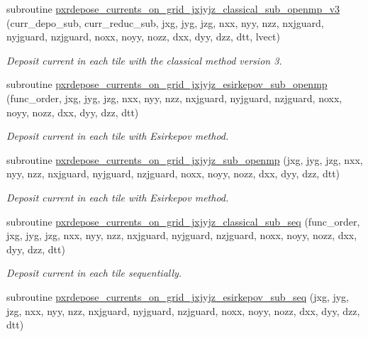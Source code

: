 \begin{DoxyCompactItemize}
subroutine \hyperlink{current__deposition_8_f90_a05b540593f69d201b9ac6e74b0fea593}{pxrdepose\+\_\+currents\+\_\+on\+\_\+grid\+\_\+jxjyjz\+\_\+classical\+\_\+sub\+\_\+openmp\+\_\+v3} (curr\+\_\+depo\+\_\+sub, curr\+\_\+reduc\+\_\+sub, jxg, jyg, jzg, nxx, nyy, nzz, nxjguard, nyjguard, nzjguard, noxx, noyy, nozz, dxx, dyy, dzz, dtt, lvect)
\begin{DoxyCompactList}\small\item\em Deposit current in each tile with the classical method version 3. \end{DoxyCompactList}\item 
subroutine \hyperlink{current__deposition_8_f90_ae617423f1f21cbacb686a291c6b0ad7b}{pxrdepose\+\_\+currents\+\_\+on\+\_\+grid\+\_\+jxjyjz\+\_\+esirkepov\+\_\+sub\+\_\+openmp} (func\+\_\+order, jxg, jyg, jzg, nxx, nyy, nzz, nxjguard, nyjguard, nzjguard, noxx, noyy, nozz, dxx, dyy, dzz, dtt)
\begin{DoxyCompactList}\small\item\em Deposit current in each tile with Esirkepov method. \end{DoxyCompactList}\item 
subroutine \hyperlink{current__deposition_8_f90_a7c88c5f1acf180c78f31dfdeb4b80516}{pxrdepose\+\_\+currents\+\_\+on\+\_\+grid\+\_\+jxjyjz\+\_\+sub\+\_\+openmp} (jxg, jyg, jzg, nxx, nyy, nzz, nxjguard, nyjguard, nzjguard, noxx, noyy, nozz, dxx, dyy, dzz, dtt)
\begin{DoxyCompactList}\small\item\em Deposit current in each tile with Esirkepov method. \end{DoxyCompactList}\item 
subroutine \hyperlink{current__deposition_8_f90_a9cba9f74ee775de5a5f60eb97ff619a4}{pxrdepose\+\_\+currents\+\_\+on\+\_\+grid\+\_\+jxjyjz\+\_\+classical\+\_\+sub\+\_\+seq} (func\+\_\+order, jxg, jyg, jzg, nxx, nyy, nzz, nxjguard, nyjguard, nzjguard, noxx, noyy, nozz, dxx, dyy, dzz, dtt)
\begin{DoxyCompactList}\small\item\em Deposit current in each tile sequentially. \end{DoxyCompactList}\item 
subroutine \hyperlink{current__deposition_8_f90_ac4575c491c1cfe9d048c6cb1b6d5fbdb}{pxrdepose\+\_\+currents\+\_\+on\+\_\+grid\+\_\+jxjyjz\+\_\+esirkepov\+\_\+sub\+\_\+seq} (jxg, jyg, jzg, nxx, nyy, nzz, nxjguard, nyjguard, nzjguard, noxx, noyy, nozz, dxx, dyy, dzz, dtt)
\item 

\end{DoxyCompactItemize}

